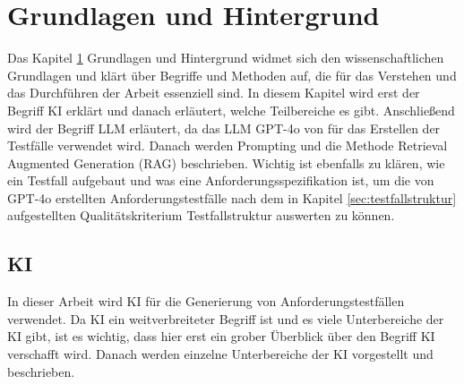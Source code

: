 \documentclass[12pt,toc=bib,toc=listof]{scrreprt}
\begin{document}
\chapter{Grundlagen und Hintergrund} %
\label{sec:grundlagenUndHintergrund}
Das Kapitel \ref{sec:grundlagenUndHintergrund} Grundlagen und Hintergrund widmet sich den wissenschaftlichen Grundlagen und klärt über Begriffe und Methoden auf, die für das Verstehen und das Durchführen der Arbeit essenziell sind. In diesem Kapitel wird erst der Begriff KI erklärt und danach erläutert, welche Teilbereiche es gibt. Anschließend wird der Begriff LLM erläutert, da das LLM GPT-4o von \textcite{OpenAI2025} für das Erstellen der Testfälle verwendet wird. Danach werden Prompting und die Methode Retrieval Augmented Generation (RAG) beschrieben. Wichtig ist ebenfalls zu klären, wie ein Testfall aufgebaut und was eine Anforderungsspezifikation ist, um die von GPT-4o erstellten Anforderungstestfälle nach dem in Kapitel \ref{sec:testfallstruktur} aufgestellten Qualitätskriterium \glqq Testfallstruktur\grqq{} auswerten zu können.

\section{KI} %
\label{sec:KI}
In dieser Arbeit wird KI für die Generierung von Anforderungstestfällen verwendet. Da KI ein weitverbreiteter Begriff ist und es viele Unterbereiche der KI gibt, ist es wichtig, dass hier erst ein grober Überblick über den Begriff KI verschafft wird. Danach werden einzelne Unterbereiche der KI vorgestellt und beschrieben.
\end{document}
